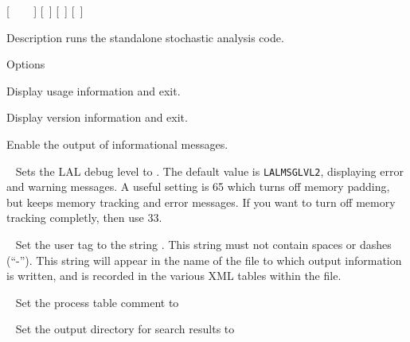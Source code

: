 \begin{entry}
 \newline \hspace*{0.5in}
[~ \newline \hspace*{0.5in}
~ \newline \hspace*{0.5in}
~] \newline \hspace*{0.5in}
[~] \newline \hspace*{0.5in}
[~] \newline \hspace*{0.5in}
[~]

\item[Description]
 runs the standalone stochastic analysis code.

\item[Options]\leavevmode
\begin{entry}
\item[\option{--help}]
Display usage information and exit.

\item[\option{--version}]
Display version information and exit.

\item[\option{--verbose}]
Enable the output of informational messages.

\item[\option{--debug-level}~\parm{N}]
Sets the LAL debug level to . The default value is
\texttt{LALMSGLVL2}, displaying error and warning messages. A useful
setting is 65 which turns off memory padding, but keeps memory tracking
and error messages. If you want to turn off memory tracking completly,
then use 33.

\item[\option{--user-tag}~\parm{STRING}]
Set the user tag to the string . This string must not
contain spaces or dashes (``-''). This string will appear in the name of
the file to which output information is written, and is recorded in the
various XML tables within the file.

\item[\option{--comment}~\parm{STRING}]
Set the process table comment to 

\item[\option{--output-dir}~\parm{DIR}]
Set the output directory for search results to 


\end{entry}
\end{entry}
